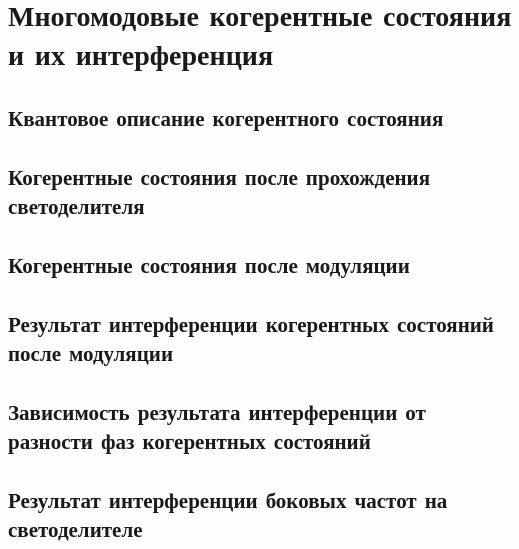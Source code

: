 \chapter{Многомодовые когерентные состояния и их интерференция}  \label{ch:ch4}
\section{Квантовое описание когерентного состояния} \label{sec:ch4/sec1}



\section{Когерентные состояния после прохождения светоделителя} \label{ch:ch4/sect2}



\section{Когерентные состояния после модуляции} \label{ch:ch4/sect3}



\section{Результат интерференции когерентных состояний после модуляции} \label{ch:ch4/sect4}



\section{Зависимость результата интерференции от разности фаз когерентных состояний} \label{ch:ch4/sect5}



\section{Результат интерференции боковых частот на светоделителе} \label{ch:ch4/sect6}




